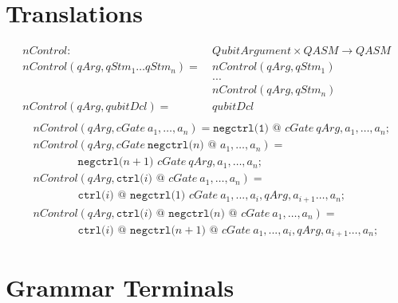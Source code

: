 \begin{appendices}
\chapter{Translations}
\label{appendix:translation}

\begin{align*}
    nControl : \ & QubitArgument \times QASM \to QASM\\
    nControl(qArg, qStm_1 \dots qStm_n) = \ & nControl(qArg, qStm_1)\\
        & ...\\
        & nControl(qArg, qStm_n)\\
    nControl(qArg, qubitDcl) = \ & qubitDcl\\
\end{align*}
\begin{align*}
    &nControl(qArg, cGate \ a_1, \dots, a_n ) =  \texttt{negctrl(1) @ } cGate \ qArg, a_1, \dots, a_n\texttt{;}\\
    &nControl(qArg, cGate \ \texttt{negctrl(}n\texttt{) @ } a_1, \dots, a_n ) = \\
    & \quad \quad \quad \quad \texttt{negctrl(}n + 1\texttt{) }cGate \ qArg, a_1, \dots, a_n\texttt{;}\\
    &nControl(qArg, \texttt{ctrl(}i \texttt{) @ } cGate \ a_1, \dots, a_n ) = \\
    & \quad \quad \quad \quad \texttt{ctrl(}i \texttt{) @ } \texttt{negctrl(}1\texttt{) } cGate \ a_1, ..., a_i, qArg, a_{i+1} \dots, a_n\texttt{;}\\
    &nControl(qArg, \texttt{ctrl(}i \texttt{) @ } \texttt{negctrl(}n\texttt{) @ } cGate \ a_1, \dots, a_n ) = \\
    & \quad \quad \quad \quad \texttt{ctrl(}i \texttt{) @ } \texttt{negctrl(}n + 1\texttt{) @ } cGate \ a_1, ..., a_i, qArg, a_{i+1} \dots, a_n\texttt{;}
\end{align*}

\chapter{Grammar Terminals}
\label{appendix:grammar_terminals}

\end{appendices}